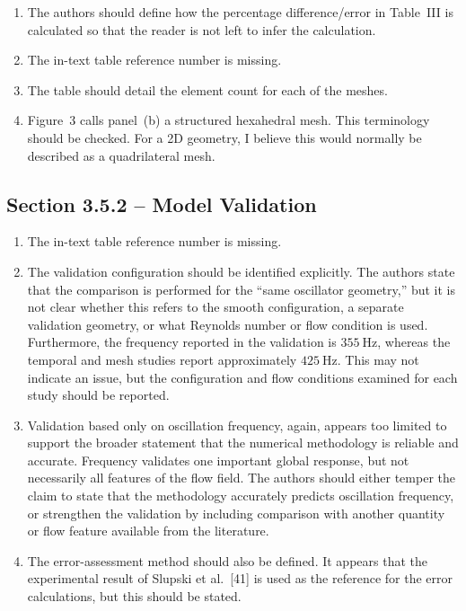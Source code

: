 \documentclass[11pt]{article}
\begin{document}
\begin{enumerate}
		\item The authors should define how the percentage difference/error in Table~III is calculated so that the reader is not left to infer the calculation.
		
		\item The in-text table reference number is missing.
		
		\item The table should detail the element count for each of the meshes.
		
		\item Figure~3 calls panel~(b) a structured hexahedral mesh. This terminology should be checked. For a 2D geometry, I believe this would normally be described as a quadrilateral mesh.
	\end{enumerate}
	
	
	\subsection*{Section 3.5.2 -- Model Validation}
	
	\begin{enumerate}
		\item The in-text table reference number is missing.
		
		\item The validation configuration should be identified explicitly. The authors state that the comparison is performed for the ``same oscillator geometry,'' but it is not clear whether this refers to the smooth configuration, a separate validation geometry, or what Reynolds number or flow condition is used. Furthermore, the frequency reported in the validation is $355~\mathrm{Hz}$, whereas the temporal and mesh studies report approximately $425~\mathrm{Hz}$. This may not indicate an issue, but the configuration and flow conditions examined for each study should be reported.
		
		\item Validation based only on oscillation frequency, again, appears too limited to support the broader statement that the numerical methodology is reliable and accurate. Frequency validates one important global response, but not necessarily all features of the flow field. The authors should either temper the claim to state that the methodology accurately predicts oscillation frequency, or strengthen the validation by including comparison with another quantity or flow feature available from the literature.
		
		\item The error-assessment method should also be defined. It appears that the experimental result of Slupski et al.~[41] is used as the reference for the error calculations, but this should be stated.
	\end{enumerate}
	
\end{document}
